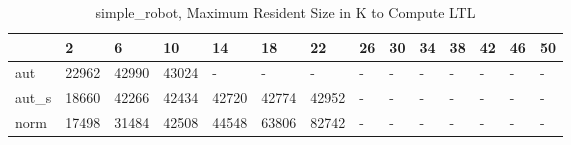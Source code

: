 \begin{table}
\caption{simple_robot, Maximum Resident Size in K to Compute LTL}
\label{simple_robot_LTL_size}
\begin{tabular}{llllllllllllll}
\toprule
 & 2 & 6 & 10 & 14 & 18 & 22 & 26 & 30 & 34 & 38 & 42 & 46 & 50 \\
\midrule
aut & 22962 & 42990 & 43024 & - & - & - & - & - & - & - & - & - & - \\
aut_s & 18660 & 42266 & 42434 & 42720 & 42774 & 42952 & - & - & - & - & - & - & - \\
norm & 17498 & 31484 & 42508 & 44548 & 63806 & 82742 & - & - & - & - & - & - & - \\
\bottomrule
\end{tabular}
\end{table}

